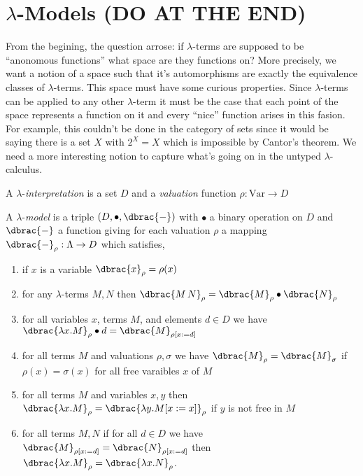 \documentclass[12pt]{article}
\begin{document}
\section{$\lambda$-Models (DO AT THE END)}

From the begining, the question arrose: if $\lambda$-terms are supposed to be ``anonomous functions'' what space are they functions on? More precisely, we want a notion of a space such that it's automorphisms are exactly the equivalence classes of $\lambda$-terms. This space must have some curious properties. Since $\lambda$-terms can be applied to any other $\lambda$-term it must be the case that each point of the space represents a function on it and every ``nice'' function arises in this fasion. For example, this couldn't be done in the category of sets since it would be saying there is a set $X$ with $2^X = X$ which is impossible by Cantor's theorem. We need a more interesting notion to capture what's going on in the untyped $\lambda$-calculus. 

\newcommand{\Var}{\mathrm{Var}}

\begin{defn}
A $\lambda$-\textit{interpretation} is a set $D$ and a \textit{valuation} function $\rho : \Var \to D$
\end{defn}

\begin{defn}
A $\lambda$-\textit{model} is a triple $(D, \bullet, \dbrac{-})$ with $\bullet$ a binary operation on $D$ and $\dbrac{-}$ a function giving for each valuation $\rho$ a mapping $\dbrac{-}_\rho : \Lambda \to D$ which satisfies,
\begin{enumerate}
\item if $x$ is a variable $\dbrac{x}_\rho = \rho(x)$
\item for any $\lambda$-terms $M, N$ then $\dbrac{M \, N}_\rho = \dbrac{M}_{\rho} \bullet \dbrac{N}_\rho$
\item for all variables $x$, terms $M$, and elements $d \in D$ we have $\dbrac{\lambda x . M}_\rho \bullet d = \dbrac{M}_{\rho [x := d]}$
\item for all terms $M$ and valuations $\rho, \sigma$ we have $\dbrac{M}_\rho = \dbrac{M}_\sigma$ if $\rho(x) = \sigma(x)$ for all free varaibles $x$ of $M$
\item for all terms $M$ and variables $x,y$ then $\dbrac{\lambda x . M}_\rho = \dbrac{\lambda y . M [x := x]}_{\rho}$ if $y$ is not free in $M$
\item for all terms $M, N$ if for all $d \in D$ we have $\dbrac{M}_{\rho [x := d]} = \dbrac{N}_{\rho [x := d]}$ then $\dbrac{\lambda x . M}_\rho = \dbrac{\lambda x . N}_\rho$.
\end{enumerate}
\end{defn}
\end{document}
